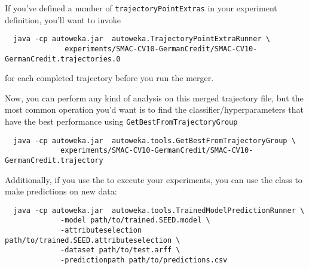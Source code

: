 \begin{aside}
 If you've defined a number of \texttt{trajectoryPointExtras} in your experiment definition, you'll want to invoke 
 \begin{verbatim}
  java -cp autoweka.jar  autoweka.TrajectoryPointExtraRunner \
              experiments/SMAC-CV10-GermanCredit/SMAC-CV10-GermanCredit.trajectories.0
 \end{verbatim}
 for each completed trajectory before you run the merger.
\end{aside}

Now, you can perform any kind of analysis on this merged trajectory file, but the most common operation you'd want is to find the classifier/hyperparameters that have the best performance using \texttt{GetBestFromTrajectoryGroup}

\begin{verbatim}
  java -cp autoweka.jar  autoweka.tools.GetBestFromTrajectoryGroup \
             experiments/SMAC-CV10-GermanCredit/SMAC-CV10-GermanCredit.trajectory
\end{verbatim}

Additionally, if you use the  to execute your experiments, you can use the class  to make predictions on new data:
\begin{verbatim}
  java -cp autoweka.jar  autoweka.tools.TrainedModelPredictionRunner \
             -model path/to/trained.SEED.model \
             -attributeselection path/to/trained.SEED.attributeselection \
             -dataset path/to/test.arff \
             -predictionpath path/to/predictions.csv
\end{verbatim}
